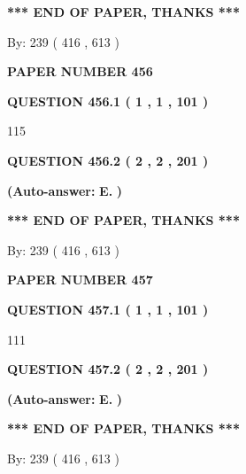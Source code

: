 \documentclass{ctexart}
\begin{document}
 
   
   
   
   
\vspace{1.0in} 
{\textbf{\large{ *** END OF PAPER, THANKS *** }}} 
   
   
\hspace{1.0in} By: 
 239 ( 416 ,  613 )
   
   
   
   
\newpage 
\setcounter{page}{ 
   456001 } 
   
   
 {\textbf{ \Large{ PAPER NUMBER  456  }}}
   
   
   
   
  
  
{\textbf{\large{QUESTION
456.1 
 ( 1 , 1 , 101 )
}}}

115
  
  
{\textbf{\large{QUESTION
456.2 
 ( 2 , 2 , 201 )
}}}
 
 
{\textbf{(Auto-answer:}}
{\textbf{\large{
E.}}}
{\textbf{)}}
 
 
   
   
   
   
\vspace{1.0in} 
{\textbf{\large{ *** END OF PAPER, THANKS *** }}} 
   
   
\hspace{1.0in} By: 
 239 ( 416 ,  613 )
   
   
   
   
\newpage 
\setcounter{page}{ 
   457001 } 
   
   
 {\textbf{ \Large{ PAPER NUMBER  457  }}}
   
   
   
   
  
  
{\textbf{\large{QUESTION
457.1 
 ( 1 , 1 , 101 )
}}}

111
  
  
{\textbf{\large{QUESTION
457.2 
 ( 2 , 2 , 201 )
}}}
 
 
{\textbf{(Auto-answer:}}
{\textbf{\large{
E.}}}
{\textbf{)}}
 
 
   
   
   
   
\vspace{1.0in} 
{\textbf{\large{ *** END OF PAPER, THANKS *** }}} 
   
   
\hspace{1.0in} By: 
 239 ( 416 ,  613 )
   
   
   
   
\newpage 
\setcounter{page}{ 
   458001 } 
   
\end{document}
